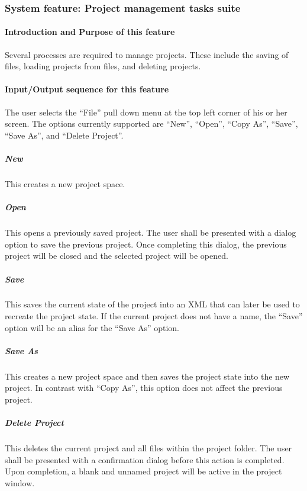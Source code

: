 \documentclass[twoside,letterpaper]{article}
\begin{document}
\clearpage






\clearpage


\subsubsection[System feature: [Project management tasks suite]{\bfseries System feature: Project management tasks suite}

\paragraph[\ Introduction/Purpose of this feature] {\bfseries Introduction and Purpose of this feature}
{
Several processes are required to manage projects. These include the saving of files, loading projects from files, and deleting projects.}


\paragraph[Input/Output sequence for this feature]{\rmfamily\bfseries Input/Output sequence for this feature}
{
The user selects the ``File'' pull down menu at the top left corner of his or her screen. The options currently supported are ``New'', ``Open'', ``Copy As'', ``Save'', ``Save As'', and ``Delete Project''. }

\subparagraph{New}
{
This creates a new project space. }

\subparagraph{Open}
{
This opens a previously saved project. The user shall be presented with a dialog option to save the previous project. Once completing this dialog, the previous project will be closed and the selected project will be opened.}

\subparagraph{Save}
{
This saves the current state of the project into an XML that can later be used to recreate the project state. If the current project does not have a name, the ``Save'' option will be an alias for the ``Save As'' option.}

\subparagraph{Save As}
{
This creates a new project space and then saves the project state into the new project. In contrast with ``Copy As'', this option does not affect the previous project. }

\subparagraph{Delete Project}
{
This deletes the current project and all files within the project folder. The user shall be presented with a confirmation dialog before this action is completed. Upon completion, a blank and unnamed project will be active in the project window. }
\end{document}
